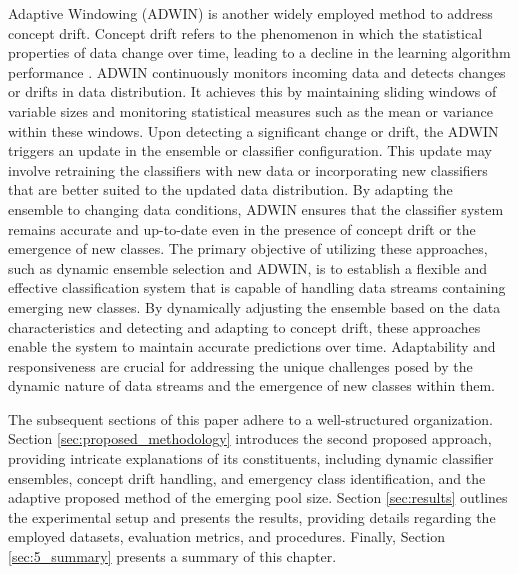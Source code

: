 Adaptive Windowing (ADWIN) is another widely employed method to address concept drift. Concept drift refers to the phenomenon in which the statistical properties of data change over time, leading to a decline in the learning algorithm performance \cite{gama2004learning, adams2023explainable, madkour2023historical}. ADWIN continuously monitors incoming data and detects changes or drifts in data distribution. It achieves this by maintaining sliding windows of variable sizes and monitoring statistical measures such as the mean or variance within these windows. Upon detecting a significant change or drift, the ADWIN triggers an update in the ensemble or classifier configuration. This update may involve retraining the classifiers with new data or incorporating new classifiers that are better suited to the updated data distribution. By adapting the ensemble to changing data conditions, ADWIN ensures that the classifier system remains accurate and up-to-date even in the presence of concept drift or the emergence of new classes. The primary objective of utilizing these approaches, such as dynamic ensemble selection and ADWIN, is to establish a flexible and effective classification system that is capable of handling data streams containing emerging new classes. By dynamically adjusting the ensemble based on the data characteristics and detecting and adapting to concept drift, these approaches enable the system to maintain accurate predictions over time. Adaptability and responsiveness are crucial for addressing the unique challenges posed by the dynamic nature of data streams and the emergence of new classes within them.

The subsequent sections of this paper adhere to a well-structured organization. Section \ref{sec:proposed_methodology} introduces the second proposed approach, providing intricate explanations of its constituents, including dynamic classifier ensembles, concept drift handling, and emergency class identification, and the adaptive proposed method of the emerging pool size. Section \ref{sec:results} outlines the experimental setup and presents the results, providing details regarding the employed datasets, evaluation metrics, and procedures. Finally,  Section \ref{sec:5_summary} presents a summary of this chapter.
  
  
